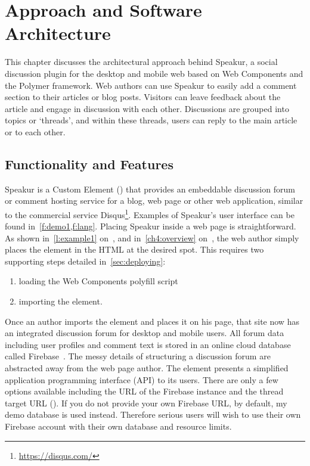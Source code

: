 \chapter{Approach and Software Architecture}
%
\label{ch:approach}

This chapter discusses the architectural approach behind Speakur, 
a social discussion plugin for the desktop and mobile web based on Web Components and the Polymer framework.
Web authors can use Speakur to easily add a comment section to their articles or blog posts.
Visitors can leave feedback about the article and engage in discussion with each other.
Discussions are grouped into topics or `threads', and within these threads, users can reply to the main article or to each other.

\section{Functionality and Features}
Speakur 
is a Custom Element 
() 
that provides an embeddable discussion forum or comment hosting service for a blog, web page or other web application, similar to the commercial service Disqus\footnote{\url{https://disqus.com/}}.
Examples of Speakur's user interface can be found in~\cref{f:demo1,f:lang}.
Placing Speakur inside a web page is straightforward.
As shown in~\cref{l:example1} on~,
and in~\cref{ch4:overview} on~,
the web author simply places the 
 element in the HTML at the desired spot.
This requires two supporting steps detailed in~\cref{sec:deploying}:
\begin{enumerate}
\item loading the Web Components polyfill script
\item importing the  element.
\end{enumerate}

Once an author imports the element and places it on his page, that site now has an integrated discussion forum for desktop and mobile users. 
All forum data including user profiles and comment text is stored in an online cloud database called Firebase~\cite{firebasecontributors2015}.
The messy details of structuring a discussion forum are abstracted away from the web page author.
The  element presents a simplified application programming interface (API) to its users.
There are only a few options available including the URL of the Firebase instance and the thread target URL ().
If you do not provide your own Firebase URL, by default, my demo database is used instead.
Therefore serious users will wish to use their own Firebase account with their own database and resource limits.


